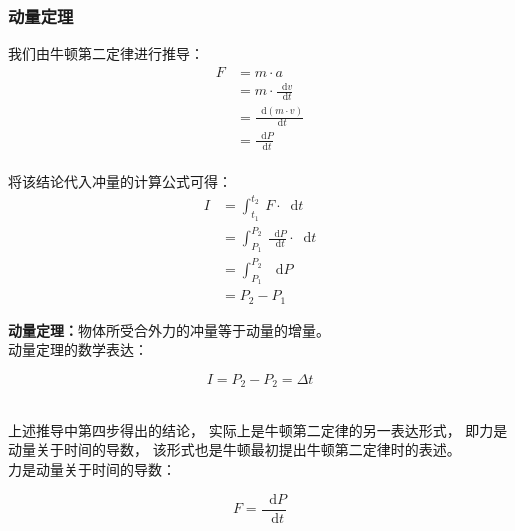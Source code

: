 \documentclass[UTF8]{ctexart}
\newcommand*{\dif}{\mathop{}\!\mathrm{d}}
\begin{document}
\subsubsection{动量定理}
    我们由牛顿第二定律进行推导：
    \setcounter{equation}{0}
    \begin{align}
        F
        &=m\cdot a\\[4mm]
        &=m\cdot\frac{\dif v}{\dif t}\\[4mm]
        &=\frac{\dif(m\cdot v)}{\dif t}\\[4mm]
        &=\frac{\dif P}{\dif t}
    \end{align}\\
    将该结论代入冲量的计算公式可得：
    \begin{align}
        I
        &=\int_{t_1}^{t_2}~F\cdot\dif t\\[4mm]
        &=\int_{P_1}^{P_2}~\frac{\dif P}{\dif t}\cdot\dif t\\[4mm]
        &=\int_{P_1}^{P_2}~\dif P\\[4mm]
        &=P_2-P_1
    \end{align}

\newpage

    \textbf{动量定理：}物体所受合外力的冲量等于动量的增量。\\[3mm]
    动量定理的数学表达：
    \begin{large}
        \begin{equation*}
            I=P_2-P_2=\Delta t
        \end{equation*}
    \end{large}\\
    上述推导中第四步得出的结论，
    实际上是牛顿第二定律的另一表达形式，
    即力是动量关于时间的导数，
    该形式也是牛顿最初提出牛顿第二定律时的表述。\\[3mm]
    力是动量关于时间的导数：
    \begin{large}
        \begin{equation*}
            F=\frac{\dif P}{\dif t}
        \end{equation*}
    \end{large}
    \vspace{-10pt}
\end{document}
